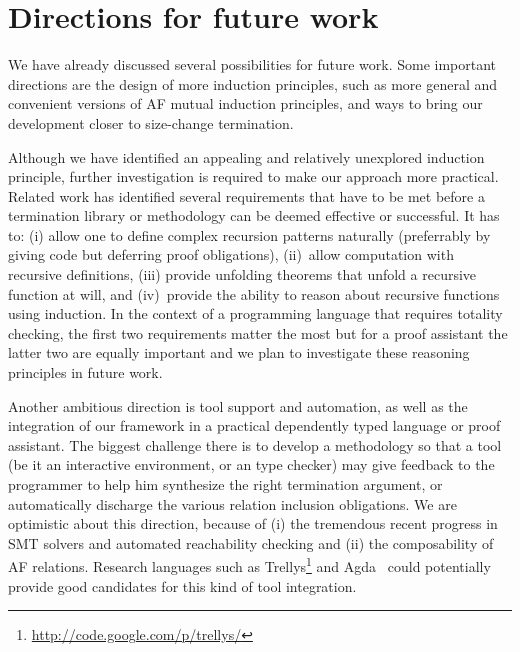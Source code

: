 \documentclass{llncs}
\begin{document}
\section{Directions for future work}\label{sect:future} 

We have already discussed several possibilities for future work. 
Some important directions are the design of more induction principles, such as more general and convenient 
versions of AF mutual induction principles, and ways to bring our development closer to size-change 
termination. 

Although we have identified an appealing and relatively unexplored induction principle, 
further investigation is required to make our approach more practical.
Related work has identified several requirements that have to be met before a 
termination library or methodology can be deemed effective or successful. It has to:
(i) allow one to define complex recursion patterns naturally 
(preferrably by giving code but deferring proof obligations), (ii)~allow computation 
with recursive definitions, (iii) provide unfolding theorems that unfold a recursive function 
at will, and (iv)~provide the ability to reason about recursive functions using induction. 
In the context of a programming language that requires totality checking, the first 
two requirements matter the most but for a proof assistant the latter two are 
equally important and we plan to investigate these reasoning principles in future work. 

Another ambitious direction is tool support and automation, as well as the integration 
of our framework in a practical dependently typed language or proof assistant. 
The biggest challenge there is to develop a methodology so that a tool (be it an interactive environment, 
or an type checker) may give feedback to the programmer to help him synthesize the right termination 
argument, or automatically discharge the various relation inclusion obligations. We are optimistic about this 
direction, because of (i) the tremendous recent progress in SMT solvers and automated reachability checking 
and (ii) the composability of AF relations. Research 
languages such as Trellys\footnote{\url{http://code.google.com/p/trellys/}} and Agda~\cite{norell:thesis}
could potentially provide good candidates for this kind of tool integration.



\end{document}
